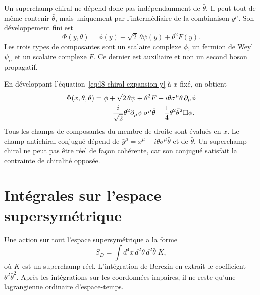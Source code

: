 Un superchamp chiral ne dépend donc pas indépendamment de \(\bar\theta\). Il peut tout de même contenir \(\bar\theta\), mais uniquement par l’intermédiaire de la combinaison \(y^\mu\). Son développement fini est
\begin{equation}
\Phi(y,\theta)
=\phi(y)+\sqrt2\,\theta\psi(y)+\theta^2F(y).
\label{eq:l8-chiral-expansion-y}
\end{equation}
Les trois types de composantes sont un scalaire complexe \(\phi\), un fermion de Weyl \(\psi_\alpha\) et un scalaire complexe \(F\). Ce dernier est auxiliaire et non un second boson propagatif.

\begin{classroomqa}
\end{classroomqa}

En développant l’équation~\eqref{eq:l8-chiral-expansion-y} à \(x\) fixé, on obtient
\begin{align}
\Phi(x,\theta,\bar\theta)
={}&\phi
+\sqrt2\,\theta\psi
+\theta^2F
+i\theta\sigma^\mu\bar\theta\,\partial_\mu\phi
\notag\\
&-\frac{i}{\sqrt2}\theta^2
\partial_\mu\psi\,\sigma^\mu\bar\theta
+\frac14\theta^2\bar\theta^2\Box\phi.
\label{eq:l8-chiral-expansion-x}
\end{align}
Tous les champs de composantes du membre de droite sont évalués en \(x\). Le champ antichiral conjugué dépend de
\(\bar y^\mu=x^\mu-i\theta\sigma^\mu\bar\theta\) et de \(\bar\theta\). Un superchamp chiral ne peut pas être réel de façon cohérente, car son conjugué satisfait la contrainte de chiralité opposée.

\section{Intégrales sur l’espace supersymétrique}

Une action sur tout l’espace supersymétrique a la forme
\begin{equation}
S_D=\int d^4x\,d^2\theta\,d^2\bar\theta\;K,
\label{eq:l8-D-term-action}
\end{equation}
où \(K\) est un superchamp réel. L’intégration de Berezin en extrait le coefficient
\(\theta^2\bar\theta^2\). Après les intégrations sur les coordonnées impaires, il ne reste qu’une lagrangienne ordinaire d’espace-temps.


